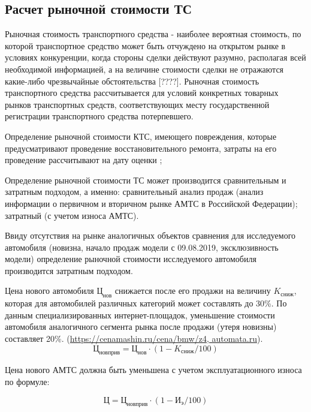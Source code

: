 \subsection{Расчет рыночной стоимости ТС}


\par \indent Рыночная стоимость транспортного средства - наиболее вероятная стоимость, по которой транспортное средство может быть отчуждено на открытом рынке в условиях конкуренции, когда стороны сделки действуют разумно, располагая всей необходимой информацией, а на величине стоимости сделки не отражаются какие-либо чрезвычайные обстоятельства [????]. Рыночная стоимость транспортного средства  рассчитывается  для условий конкретных товарных рынков транспортных средств, соответствующих месту государственной регистрации транспортного средства потерпевшего.
\par Определение рыночной стоимости КТС, имеющего повреждения, которые предусматривают проведение восстановительного ремонта, затраты на его проведение рассчитывают на дату оценки \cite[1, п.2.10]{dor:2016};
\par Определение рыночной стоимости ТС может производится сравнительным и затратным подходом, а именно:  сравнительный анализ продаж (анализ информации о первичном и вторичном рынке АМТС в Российской Федерации);  затратный (с учетом износа АМТС).
\par Ввиду отсутствия на рынке аналогичных объектов сравнения для исследуемого автомобиля (новизна, начало продаж модели с 09.08.2019, эксклюзивность модели) определение рыночной стоимости исследуемого автомобиля производится затратным подходом.

\par Цена нового автомобиля  $  \text{Ц}_\text{нов} $ снижается после его продажи на величину $ K_\text{сниж} $, которая для автомобилей различных категорий может составлять до 30\%. По данным специализированных интернет-площадок, уменьшение стоимости автомобиля аналогичного сегмента рынка после продажи (утеря новизны) составляет 20\%. (\url{https://cenamashin.ru/cena/bmw/z4, automata.ru}).
\begin{equation}\label{f:r}
\text{Ц}_\text{новприв} = \text{Ц}_\text{нов} \cdot (1-K_\text{сниж}/100)
\end{equation}

Цена нового АМТС   должна быть уменьшена с учетом эксплуатационного износа   по формуле:

\begin{equation}\label{f:n}
\text{Ц} = \text{Ц}_\text{новприв} \cdot (1-\text{И}_\text{э}/100)
\end{equation}


